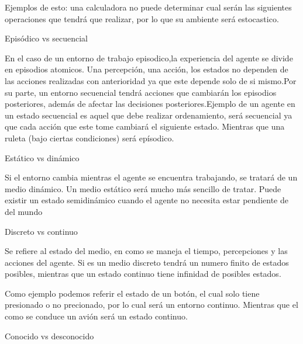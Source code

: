\documentclass{article}
\begin{document}
Ejemplos de esto: una calculadora no puede determinar cual serán las siguientes operaciones que tendrá que realizar, por lo que su ambiente será estocastico.

\vspace{5mm}

Episódico vs secuencial

\vspace{5mm}

En el caso de un entorno de trabajo episodico,la experiencia del agente se divide en episodios atomicos. Una percepción, una acción, los estados no dependen de las acciones realizadas con anterioridad ya que este depende solo de si mismo.Por su parte, un entorno secuencial tendrá acciones que cambiarán los episodios posteriores, además de afectar las decisiones posteriores.Ejemplo de un agente en un estado secuencial es aquel que debe realizar ordenamiento, será secuencial ya que cada acción que este tome cambiará el siguiente estado. Mientras que una ruleta (bajo ciertas condiciones) será epísodico.

\vspace{5mm}

Estático vs dinámico

\vspace{5mm}

Si el entorno cambia mientras el agente se encuentra trabajando, se tratará de un medio dinámico. Un medio estático será mucho más sencillo de tratar. Puede existir un estado semidinámico cuando el agente no necesita estar pendiente de del mundo

\vspace{5mm}

Discreto vs continuo

\vspace{5mm}

Se refiere al estado del medio, en como se maneja el tiempo, percepciones y las acciones del agente. Si es un medio discreto tendrá un numero finito de estados posibles, mientras que un estado continuo tiene infinidad de posibles estados.

Como ejemplo podemos referir el estado de un botón, el cual solo tiene presionado o no precionado, por lo cual será un entorno continuo. Mientras que el como se conduce un avión será un estado continuo. 

\vspace{5mm}

Conocido vs desconocido

\vspace{5mm}
\end{document}
